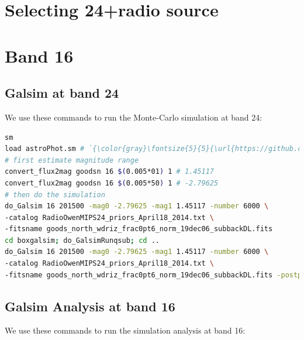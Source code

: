 \documentclass[11pt,a4paper]{article}
\begin{document}

\clearpage


\section{Selecting 24+radio source}


\clearpage


\section{Band 16}
\subsection{Galsim at band 24}

We use these commands to run the Monte-Carlo simulation at band 24:

\begin{lstlisting}[language=bash]
sm
load astroPhot.sm # `{\color{gray}\fontsize{5}{5}{\url{https://github.com/1054/DeepFields.SuperDeblending/blob/master/Softwares/Supermongo_macro/astroPhot.sm}}}`
# first estimate magnitude range
convert_flux2mag goodsn 16 $(0.005*01) 1 # 1.45117
convert_flux2mag goodsn 16 $(0.005*50) 1 # -2.79625
# then do the simulation
do_Galsim 16 201500 -mag0 -2.79625 -mag1 1.45117 -number 6000 \
-catalog RadioOwenMIPS24_priors_April18_2014.txt \
-fitsname goods_north_wdriz_frac0pt6_norm_19dec06_subbackDL.fits
cd boxgalsim; do_GalsimRunqsub; cd ..
do_Galsim 16 201500 -mag0 -2.79625 -mag1 1.45117 -number 6000 \
-catalog RadioOwenMIPS24_priors_April18_2014.txt \
-fitsname goods_north_wdriz_frac0pt6_norm_19dec06_subbackDL.fits -postparallel
\end{lstlisting}

\subsection{Galsim Analysis at band 16}

We use these commands to run the simulation analysis at band 16:
\end{document}
